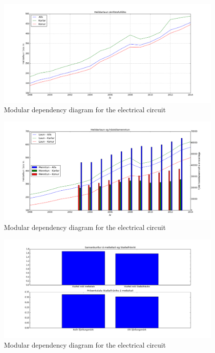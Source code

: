 \documentclass[12pt, svn, draft]{rureport}
\begin{document}
\begin{figure}
	\centering 
	\includegraphics[scale=0.7]{../graphics/Heildar_laun.png}
	\caption{Modular dependency diagram for the electrical circuit \label{fig:heildarlaun}}
\end{figure}

\begin{figure}
	\centering 
	\includegraphics[scale=0.7]{../graphics/Heildar_laun_og_haskolamentun.png}
	\caption{Modular dependency diagram for the electrical circuit \label{fig:heildarhask}}
\end{figure}

\begin{figure}
	\centering 
	\includegraphics[scale=0.7]{../graphics/medaltal_stadalfravik_menntun_utan_innan_hs.png}
	\caption{Modular dependency diagram for the electrical circuit \label{fig:stdhs}}
\end{figure}
\end{document}
